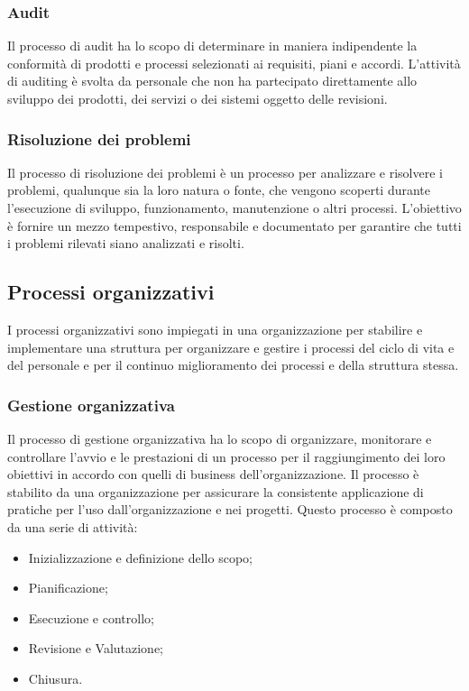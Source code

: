 \subsubsection{Audit}
Il processo di audit ha lo scopo di determinare in maniera indipendente la conformità di prodotti e processi selezionati ai requisiti, piani e accordi. L'attività di auditing è svolta da personale che non ha partecipato direttamente allo sviluppo dei prodotti, dei servizi o dei sistemi oggetto delle revisioni.

\subsubsection{Risoluzione dei problemi}
Il processo di risoluzione dei problemi è un processo per analizzare e risolvere i problemi, qualunque sia la loro natura o fonte, che vengono scoperti durante l'esecuzione di sviluppo, funzionamento, manutenzione o altri processi. L'obiettivo è fornire un mezzo tempestivo, responsabile e documentato per garantire che tutti i problemi rilevati siano analizzati e risolti.

\subsection{Processi organizzativi}
I processi organizzativi sono impiegati in  una organizzazione per stabilire e implementare una struttura per organizzare  e gestire i processi del ciclo di vita e  del personale e per il continuo miglioramento dei processi e della struttura stessa.

\subsubsection{Gestione organizzativa}
Il processo di gestione organizzativa ha lo scopo di organizzare, monitorare e controllare l’avvio e le prestazioni di un processo per il raggiungimento dei loro obiettivi in accordo con quelli di business dell’organizzazione. Il processo è stabilito da una organizzazione per assicurare la consistente applicazione di pratiche per l’uso dall’organizzazione e nei progetti. Questo processo è composto da una serie di attività:
\begin{itemize}
	\item Inizializzazione e definizione dello scopo;
	
	\item Pianificazione;
	
	\item Esecuzione e controllo;
	
	\item Revisione e Valutazione;
	
	\item Chiusura.
\end{itemize}

